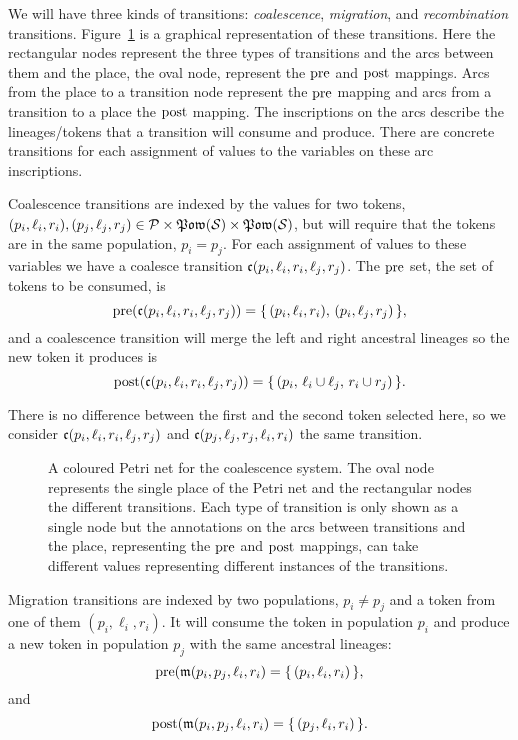 We will have three kinds of transitions: \emph{coalescence}, \emph{migration}, and \emph{recombination} transitions. Figure~\ref{fig:ctmc-cpn} is a graphical representation of these transitions. Here the rectangular nodes represent the three types of transitions and the arcs between them and the place, the oval node, represent the $\operatorname{pre}$ and $\operatorname{post}$ mappings. Arcs from the place to a transition node represent the $\operatorname{pre}$ mapping and arcs from a transition to a place the $\operatorname{post}$ mapping. The inscriptions on the arcs describe the lineages/tokens that a transition will consume and produce. There are concrete transitions for each assignment of values to the variables on these arc inscriptions.

Coalescence transitions are indexed by the values for two tokens, $(p_i,\ell_i,r_i),(p_j,\ell_j,r_j)\in\mathcal{P}\times\mathfrak{Pow}(\mathcal{S})\times\mathfrak{Pow}(\mathcal{S})$, but will require that the tokens are in the same population, $p_i = p_j$. For each assignment of values to these variables we have a coalesce transition $\mathfrak{c}(p_i,\ell_i,r_i,\ell_j,r_j)$. The $\operatorname{pre}$ set, the set of tokens to be consumed, is
\[
    \operatorname{pre}(\mathfrak{c}(p_i,\ell_i,r_i,\ell_j,r_j)) =
    \{\,(p_i,\ell_i,r_i),\,(p_i,\ell_j,r_j)\,\}
    ,
\]
and a coalescence transition will merge the left and right ancestral lineages so the new token it produces is
\[
    \operatorname{post}(\mathfrak{c}(p_i,\ell_i,r_i,\ell_j,r_j)) =
    \{\,(p_i,\,\ell_i\cup\ell_j,\,r_i\cup r_j)\,\}
    .
\]

There is no difference between the first and the second token selected here, so we consider $\mathfrak{c}(p_i,\ell_i,r_i,\ell_j,r_j)$ and $\mathfrak{c}(p_j,\ell_j,r_j,\ell_i,r_i)$ the same transition.

\begin{figure}[tb]
  \caption{A coloured Petri net for the coalescence system.
  The oval node represents the single place of the Petri net and the rectangular nodes the different transitions. Each type of transition is only shown as a single node but the annotations on the arcs between transitions and the place, representing the $\operatorname{pre}$ and $\operatorname{post}$ mappings, can take different values representing different instances of the transitions.}
  \label{fig:ctmc-cpn}
\end{figure}

Migration transitions are indexed by two populations, $p_i \neq p_j$ and a token from one of them $(p_i,\ell_i,r_i)$. It will consume the token in population $p_i$ and produce a new token in population $p_j$ with the same ancestral lineages:
\[
    \operatorname{pre}(\mathfrak{m}(p_i,p_j,\ell_i,r_i) =
    \{\,(p_i,\ell_i,r_i)\,\}
    ,
\]and\[
    \operatorname{post}(\mathfrak{m}(p_i,p_j,\ell_i,r_i) =
    \{\,(p_j,\ell_i,r_i)\,\}
    .
\]

